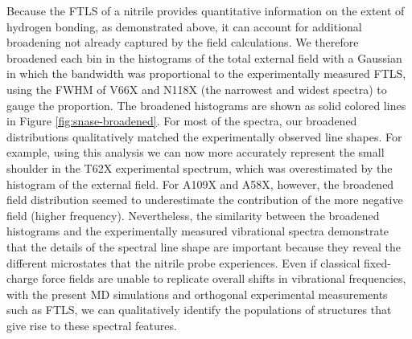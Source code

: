 Because the FTLS of a nitrile provides quantitative information on the extent of hydrogen bonding, as demonstrated above, it can account for additional broadening not already captured by the field calculations. 
We therefore broadened each bin in the histograms of the total external field with a Gaussian in which the bandwidth was proportional to the experimentally measured FTLS, using the FWHM of V66X and N118X (the narrowest and widest spectra) to gauge the proportion. 
The broadened histograms are shown as solid colored lines in Figure \ref{fig:snase-broadened}. 
For most of the spectra, our broadened distributions qualitatively matched the experimentally observed line shapes. 
For example, using this analysis we can now more accurately represent the small shoulder in the T62X experimental spectrum, which was overestimated by the histogram of the external field. 
For A109X and A58X, however, the broadened field distribution seemed to underestimate the contribution of the more negative field (higher frequency). 
Nevertheless, the similarity between the broadened histograms and the experimentally measured vibrational spectra demonstrate that the details of the spectral line shape are important because they reveal the different microstates that the nitrile probe experiences. 
Even if classical fixed-charge force fields are unable to replicate overall shifts in vibrational frequencies, with the present MD simulations and orthogonal experimental measurements such as FTLS, we can qualitatively identify the populations of structures that give rise to these spectral features. 

